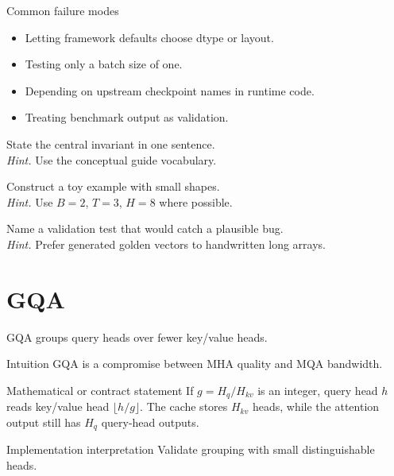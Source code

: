 \begin{warningbox}{Common failure modes}
\begin{itemize}
\item Letting framework defaults choose dtype or layout.
\item Testing only a batch size of one.
\item Depending on upstream checkpoint names in runtime code.
\item Treating benchmark output as validation.
\end{itemize}
\end{warningbox}

\begin{chapterexercises}
\item State the central invariant in one sentence.\\
\textit{Hint.} Use the conceptual guide vocabulary.
\item Construct a toy example with small shapes.\\
\textit{Hint.} Use $B=2$, $T=3$, $H=8$ where possible.
\item Name a validation test that would catch a plausible bug.\\
\textit{Hint.} Prefer generated golden vectors to handwritten long arrays.
\end{chapterexercises}

\chapter{GQA}
\label{ch:gqa}
GQA groups query heads over fewer key/value heads. \citep{ainslie2023gqa}



\begin{intuitionbox}{Intuition}
GQA is a compromise between MHA quality and MQA bandwidth.
\end{intuitionbox}

\begin{definitionbox}{Mathematical or contract statement}
If \(g=H_q/H_{kv}\) is an integer, query head \(h\) reads key/value head \(\lfloor h/g\rfloor\). The cache stores \(H_{kv}\) heads, while the attention output still has \(H_q\) query-head outputs.
\end{definitionbox}

\begin{implementationbox}{Implementation interpretation}
Validate grouping with small distinguishable heads.
\end{implementationbox}

